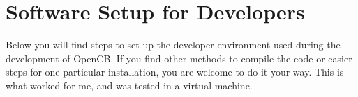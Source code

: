 
\section{Software Setup for Developers} \label{sec:software-setup-for-developers}

Below you will find steps to set up the developer environment used during the development of OpenCB. If you find other methods to compile the code or easier steps for one particular installation, you are welcome to do it your way. This is what worked for me, and was tested in a virtual machine.

